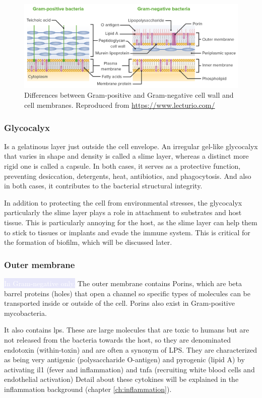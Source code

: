     \begin{figure}[ht]
        \centering
            \includegraphics[width=0.7\linewidth]{figures/Staph/Differences-between-gram-positive-and-gram-negative-bacteria-cell.png} 
            \caption{Differences between Gram-positive and Gram-negative cell wall and cell membranes. Reproduced from \url{https://www.lecturio.com/}}
            \label{figure:gram}
    \end{figure}

\subsubsection{Glycocalyx}

Is a gelatinous layer just outside the cell envelope. An irregular gel-like glycocalyx that varies in shape and density is called a slime layer, whereas a distinct more rigid one is called a capsule. In both cases, it serves as a protective function, preventing desiccation, detergents, heat, antibiotics, and phagocytosis. And also in both cases, it contributes to the bacterial structural integrity. 

In addition to protecting the cell from environmental stresses, the glycocalyx particularly the slime layer plays a role in attachment to substrates and host tissue. This is particularly annoying for the host, as the slime layer can help them to stick to tissues or implants and evade the immune system. This is critical for the formation of biofilm, which will be discussed later.

\subsubsection{Outer membrane}
\label{staph:OuterMembrane}

\colorbox{Lavender}{\textcolor{white}{In Gram-negative only.}} The outer membrane contains Porins, which are beta barrel proteins (holes) that open a channel so  specific types of molecules can be transported inside or outside of the cell. Porins also exist in Gram-positive mycobacteria.

It also contains \gls{lps}. These are large molecules that are toxic to humans but are not released from the bacteria towards the host, so they are denominated endotoxin (within-toxin) and are often a synonym of LPS. They are characterized as being very antigenic (polysaccharide O-antigen) and pyrogenic (lipid A) by activating \gls{il1} (fever and inflammation) and \gls{tnfa} (recruiting white blood cells and endothelial activation) Detail about these cytokines will be explained in the inflammation background (chapter  \ref{ch:inflammation}).

